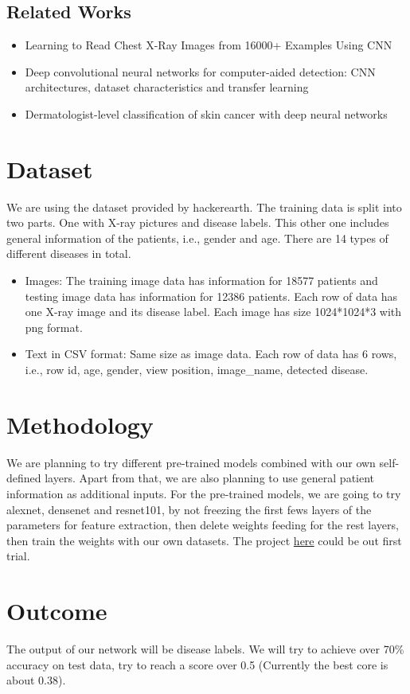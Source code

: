 \documentclass[10pt,twocolumn,letterpaper]{article}
\begin{document}
    \subsection{Related Works}
        \begin{itemize}
            \item Learning to Read Chest X-Ray Images from 16000+ Examples Using CNN \cite{dong2017learning}
             \item Deep convolutional neural networks for computer-aided detection: CNN architectures, dataset characteristics and transfer learning \cite{shin2016deep}
              \item Dermatologist-level classification of skin cancer with deep neural networks
              \cite{esteva2017dermatologist}
        \end{itemize}

\section{Dataset}
We are using the dataset provided by hackerearth. The training data is split into two parts. One with X-ray pictures and disease labels. This other one includes general information of the patients, i.e., gender and age. There are 14 types of different diseases in total.

\begin{itemize}
	\item Images:  The training image data has information for 18577 patients and testing image data has information for 12386 patients. Each row of data has one X-ray image and its disease label. Each image has size 1024*1024*3 with png format.
	\item Text in CSV format: Same size as image data. Each row of data has 6 rows, i.e., row id, age, gender, view position, image\_name, detected disease.
\end{itemize}

\section{Methodology}
We are planning to try different pre-trained models combined with our own self-defined layers. Apart from that, we are also planning to use general patient information as additional inputs.
For the pre-trained models, we are going to try alexnet, densenet and resnet101, by not freezing the first fews layers of the parameters for feature extraction, then delete weights feeding for the rest layers, then train the weights with our own datasets.
The project \href{https://github.com/ayush1997/Xvision}{here} could be out first trial.

\section{Outcome}
The output of our network will be disease labels. We will try to achieve over 70\% accuracy on test data, try to reach a score over 0.5 (Currently the best core is about 0.38).

{\small


}
\end{document}
